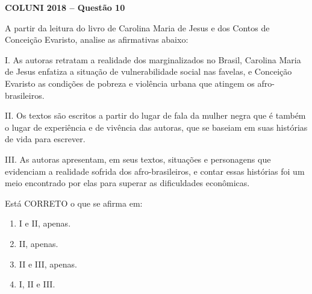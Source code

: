 \textbf{COLUNI 2018 -- Questão 10}\par\medskip A partir da leitura do livro de Carolina Maria de Jesus e dos Contos de Conceição Evaristo, analise as afirmativas abaixo:

\par

I. As autoras retratam a realidade dos marginalizados no Brasil, Carolina Maria de Jesus enfatiza a situação de vulnerabilidade social nas favelas, e Conceição Evaristo as condições de pobreza e violência urbana que atingem os afro-brasileiros.

II. Os textos são escritos a partir do lugar de fala da mulher negra que é também o lugar de experiência e de vivência das autoras, que se baseiam em suas histórias de vida para escrever.

III. As autoras apresentam, em seus textos, situações e personagens que evidenciam a realidade sofrida dos afro-brasileiros, e contar essas histórias foi um meio encontrado por elas para superar as dificuldades econômicas.

\par

Está CORRETO o que se afirma em:\begin{enumerate}
\item I e II, apenas.
\item II, apenas.
\item II e III, apenas.
\item I, II e III.
\end{enumerate}
